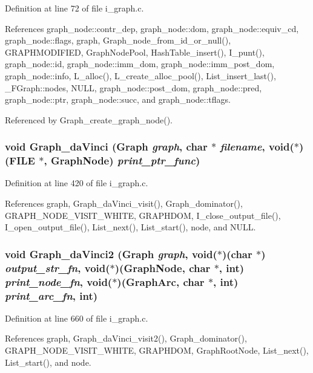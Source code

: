 Definition at line 72 of file i\_\-graph.c.

References graph\_\-node::contr\_\-dep, graph\_\-node::dom, graph\_\-node::equiv\_\-cd, graph\_\-node::flags, graph, Graph\_\-node\_\-from\_\-id\_\-or\_\-null(), GRAPHMODIFIED, Graph\-Node\-Pool, Hash\-Table\_\-insert(), I\_\-punt(), graph\_\-node::id, graph\_\-node::imm\_\-dom, graph\_\-node::imm\_\-post\_\-dom, graph\_\-node::info, L\_\-alloc(), L\_\-create\_\-alloc\_\-pool(), List\_\-insert\_\-last(), \_\-FGraph::nodes, NULL, graph\_\-node::post\_\-dom, graph\_\-node::pred, graph\_\-node::ptr, graph\_\-node::succ, and graph\_\-node::tflags.

Referenced by Graph\_\-create\_\-graph\_\-node().
\subsubsection{\setlength{\rightskip}{0pt plus 5cm}void Graph\_\-da\-Vinci (\bf{Graph} {\em graph}, char $\ast$ {\em filename}, void($\ast$)(FILE $\ast$, \bf{Graph\-Node}) {\em print\_\-ptr\_\-func})}\label{i__graph_8h_277dd7e82e82f10d773e9443f2ddb02b}




Definition at line 420 of file i\_\-graph.c.

References graph, Graph\_\-da\-Vinci\_\-visit(), Graph\_\-dominator(), GRAPH\_\-NODE\_\-VISIT\_\-WHITE, GRAPHDOM, I\_\-close\_\-output\_\-file(), I\_\-open\_\-output\_\-file(), List\_\-next(), List\_\-start(), node, and NULL.
\subsubsection{\setlength{\rightskip}{0pt plus 5cm}void Graph\_\-da\-Vinci2 (\bf{Graph} {\em graph}, void($\ast$)(char $\ast$) {\em output\_\-str\_\-fn}, void($\ast$)(\bf{Graph\-Node}, char $\ast$, int) {\em print\_\-node\_\-fn}, void($\ast$)(\bf{Graph\-Arc}, char $\ast$, int) {\em print\_\-arc\_\-fn}, int)}\label{i__graph_8h_a994b61866e6affecb5a86c8aac7aac8}




Definition at line 660 of file i\_\-graph.c.

References graph, Graph\_\-da\-Vinci\_\-visit2(), Graph\_\-dominator(), GRAPH\_\-NODE\_\-VISIT\_\-WHITE, GRAPHDOM, Graph\-Root\-Node, List\_\-next(), List\_\-start(), and node.
